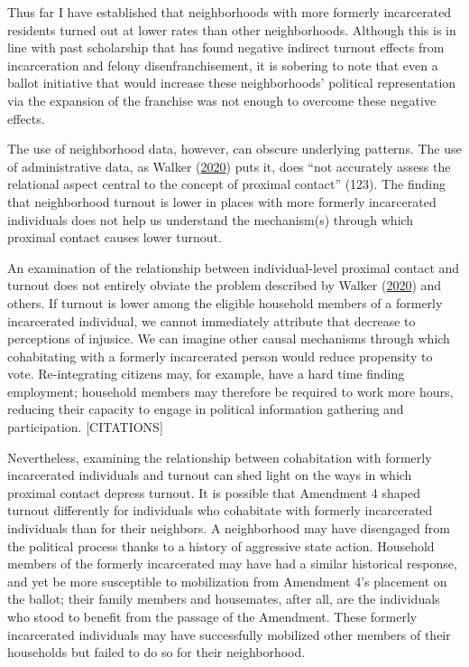 \documentclass[
  12pt,
]{article}
\begin{document}
Thus far I have established that neighborhoods with more formerly incarcerated residents turned out at lower rates than other neighborhoods. Although this is in line with past scholarship that has found negative indirect turnout effects from incarceration and felony disenfranchisement, it is sobering to note that even a ballot initiative that would increase these neighborhoods' political representation via the expansion of the franchise was not enough to overcome these negative effects.

The use of neighborhood data, however, can obscure underlying patterns. The use of administrative data, as Walker (\protect\hyperlink{ref-Walker2020}{2020}) puts it, does ``not accurately assess the relational aspect central to the concept of proximal contact'' (123). The finding that neighborhood turnout is lower in places with more formerly incarcerated individuals does not help us understand the mechanism(s) through which proximal contact causes lower turnout.

An examination of the relationship between individual-level proximal contact and turnout does not entirely obviate the problem described by Walker (\protect\hyperlink{ref-Walker2020}{2020}) and others. If turnout is lower among the eligible household members of a formerly incarcerated individual, we cannot immediately attribute that decrease to perceptions of injusice. We can imagine other causal mechanisms through which cohabitating with a formerly incarcerated person would reduce propensity to vote. Re-integrating citizens may, for example, have a hard time finding employment; household members may therefore be required to work more hours, reducing their capacity to engage in political information gathering and participation. {[}CITATIONS{]}

Nevertheless, examining the relationship between cohabitation with formerly incarcerated individuals and turnout can shed light on the ways in which proximal contact depress turnout. It is possible that Amendment 4 shaped turnout differently for individuals who cohabitate with formerly incarcerated individuals than for their neighbors. A neighborhood may have disengaged from the political process thanks to a history of aggressive state action. Household members of the formerly incarcerated may have had a similar historical response, and yet be more susceptible to mobilization from Amendment 4's placement on the ballot; their family members and housemates, after all, are the individuals who stood to benefit from the passage of the Amendment. These formerly incarcerated individuals may have successfully mobilized other members of their households but failed to do so for their neighborhood.
\end{document}
